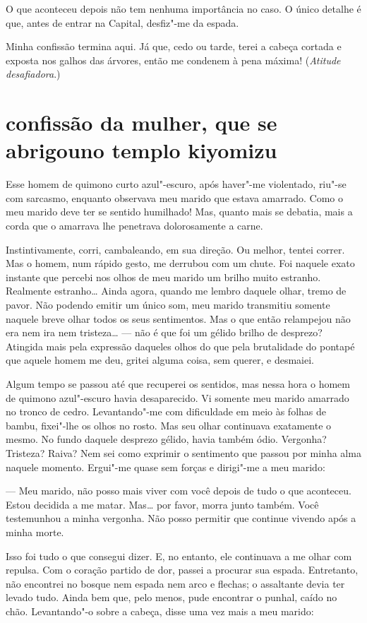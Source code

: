 O que aconteceu depois não tem nenhuma importância no caso. O único
detalhe é que, antes de entrar na Capital, desfiz"-me da espada.

Minha confissão termina aqui. Já que, cedo ou tarde, terei a cabeça
cortada e exposta nos galhos das árvores, então me condenem à pena
máxima! (\textit{Atitude desafiadora}.)

\section*{confissão da mulher, que se abrigou\break no templo kiyomizu}

Esse homem de quimono curto azul"-escuro, após haver"-me violentado,
riu"-se com sarcasmo, enquanto observava meu marido que estava amarrado.
Como o meu marido deve ter se sentido humilhado! Mas, quanto mais se
debatia, mais a corda que o amarrava lhe penetrava dolorosamente a
carne.

Instintivamente, corri, cambaleando, em sua direção. Ou melhor, tentei
correr. Mas o homem, num rápido gesto, me derrubou com um chute. Foi
naquele exato instante que percebi nos olhos de meu marido um brilho
muito estranho. Realmente estranho\ldots{} Ainda agora, quando me lembro
daquele olhar, tremo de pavor. Não podendo emitir um único som, meu
marido transmitiu somente naquele breve olhar todos os seus
sentimentos. Mas o que então relampejou não era nem ira nem tristeza\ldots{} 
--- não é que foi um gélido brilho de desprezo? Atingida mais pela
expressão daqueles olhos do que pela brutalidade do pontapé que aquele
homem me deu, gritei alguma coisa, sem querer, e desmaiei.

Algum tempo se passou até que recuperei os sentidos, mas nessa hora o
homem de quimono azul"-escuro havia desaparecido. Vi somente meu marido
amarrado no tronco de cedro. Levantando"-me com dificuldade em meio às
folhas de bambu, fixei"-lhe os olhos no rosto. Mas seu olhar continuava
exatamente o mesmo. No fundo daquele desprezo gélido, havia também
ódio. Vergonha? Tristeza? Raiva? Nem sei como exprimir o sentimento que
passou por minha alma naquele momento. Ergui"-me quase sem forças e
dirigi"-me a meu marido:

--- Meu marido, não posso mais viver com você depois de tudo o que
aconteceu. Estou decidida a me matar. Mas\ldots{} por favor, morra junto
também. Você testemunhou a minha vergonha. Não posso permitir que
continue vivendo após a minha morte.					

Isso foi tudo o que consegui dizer. E, no entanto, ele continuava a me
olhar com repulsa. Com o coração partido de dor, passei a procurar sua
espada. Entretanto, não encontrei no bosque nem espada nem arco e
flechas; o assaltante devia ter levado tudo. Ainda bem que, pelo menos,
pude encontrar o punhal, caído no chão. Levantando"-o sobre a cabeça,
disse uma vez mais a meu marido:

